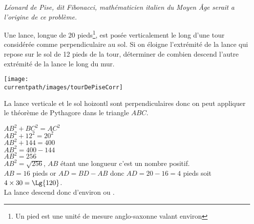     {\it Léonard de Pise, dit Fibonacci, mathématicien italien du Moyen Âge serait a l'origine de ce problème.}

    Une lance, longue de 20 pieds\footnote{Un pied est une unité de mesure anglo-saxonne valant environ }, est posée
    verticalement le long d'une tour considérée comme perpendiculaire au sol. Si on éloigne l'extrémité de la lance qui repose
    sur le sol de 12 pieds de la tour, déterminer de combien descend l'autre extrémité de la lance le long du mur.

    \texttt{[image: \\currentpath/images/tourDePiseCorr]}

    {\red La lance verticale et le sol hoizontl sont perpendiculaires donc on peut appliquer le théorème de Pythagore dans le triangle $ABC$.

    $AB^2+BC^2=AC^2$\\
    $AB^2+12^2=20^2$\\
    $AB^2+144=400$\\
    $AB^2=400-144$\\
    $AB^2=256$\\
    $AB^2=\sqrt{256}$, $AB$ étant une longueur c'est un nombre positif.\\
    $AB=16$ pieds or $AD=BD-AB$ donc $AD=20-16=4$ pieds soit $4\times 30=\Lg{120}$.\\
    La lance descend donc d'environ  ou .
    }
